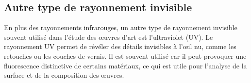 \documentclass[answers]{exam}
\begin{document}
\begin{solution}

\subsection*{Autre type de rayonnement invisible}

En plus des rayonnements infrarouges, un autre type de rayonnement invisible souvent utilisé dans l'étude des œuvres d'art est l'ultraviolet (UV). Le rayonnement UV permet de révéler des détails invisibles à l'œil nu, comme les retouches ou les couches de vernis. Il est souvent utilisé car il peut provoquer une fluorescence distinctive de certains matériaux, ce qui est utile pour l'analyse de la surface et de la composition des œuvres.

\end{solution}
\end{document}
